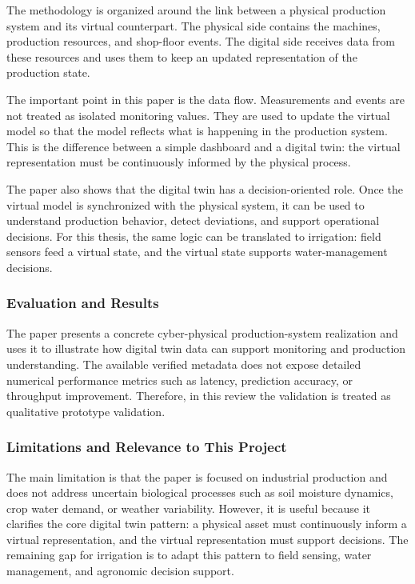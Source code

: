 The methodology is organized around the link between a physical production system and its virtual counterpart. The physical side contains the machines, production resources, and shop-floor events. The digital side receives data from these resources and uses them to keep an updated representation of the production state.

The important point in this paper is the data flow. Measurements and events are not treated as isolated monitoring values. They are used to update the virtual model so that the model reflects what is happening in the production system. This is the difference between a simple dashboard and a digital twin: the virtual representation must be continuously informed by the physical process.

The paper also shows that the digital twin has a decision-oriented role. Once the virtual model is synchronized with the physical system, it can be used to understand production behavior, detect deviations, and support operational decisions. For this thesis, the same logic can be translated to irrigation: field sensors feed a virtual state, and the virtual state supports water-management decisions.

\subsubsection{Evaluation and Results}

The paper presents a concrete cyber-physical production-system realization and uses it to illustrate how digital twin data can support monitoring and production understanding. The available verified metadata does not expose detailed numerical performance metrics such as latency, prediction accuracy, or throughput improvement. Therefore, in this review the validation is treated as qualitative prototype validation.

\subsubsection{Limitations and Relevance to This Project}

The main limitation is that the paper is focused on industrial production and does not address uncertain biological processes such as soil moisture dynamics, crop water demand, or weather variability. However, it is useful because it clarifies the core digital twin pattern: a physical asset must continuously inform a virtual representation, and the virtual representation must support decisions. The remaining gap for irrigation is to adapt this pattern to field sensing, water management, and agronomic decision support.

